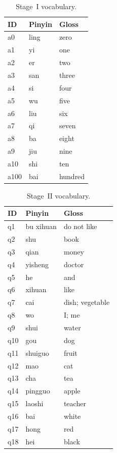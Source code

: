\begin{table}[H]
\centering
\caption{Stage~I vocabulary.}
\label{tab:app:stage1_vocab}
\small
\begin{tabular}{@{}lll@{}}
\toprule
\textbf{ID} & \textbf{Pinyin} & \textbf{Gloss} \\
\midrule
a0 & ling & zero \\
a1 & yi & one \\
a2 & er & two \\
a3 & san & three \\
a4 & si & four \\
a5 & wu & five \\
a6 & liu & six \\
a7 & qi & seven \\
a8 & ba & eight \\
a9 & jiu & nine \\
a10 & shi & ten \\
a100 & bai & hundred \\
\bottomrule
\end{tabular}
\end{table}

\begin{table}[H]
\centering
\caption{Stage~II vocabulary.}
\label{tab:app:stage2_vocab}
\small
\setlength{\tabcolsep}{4pt}
\begin{tabular}{@{}lll@{}}
\toprule
\textbf{ID} & \textbf{Pinyin} & \textbf{Gloss} \\
\midrule
q1 & bu xihuan & do not like \\
q2 & shu & book \\
q3 & qian & money \\
q4 & yisheng & doctor \\
q5 & he & and \\
q6 & xihuan & like \\
q7 & cai & dish; vegetable \\
q8 & wo & I; me \\
q9 & shui & water \\
q10 & gou & dog \\
q11 & shuiguo & fruit \\
q12 & mao & cat \\
q13 & cha & tea \\
q14 & pingguo & apple \\
q15 & laoshi & teacher \\
q16 & bai & white \\
q17 & hong & red \\
q18 & hei & black \\
\bottomrule
\end{tabular}
\end{table}

